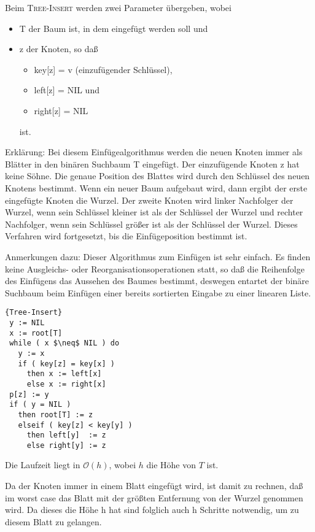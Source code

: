 \documentclass[ngerman,draft,parskip=half*,twoside]{scrreprt}
\theoremstyle{break}
\theoremstyle{nonumberbreak}
\newcommand*{\OO}{\mathcal{O}}      %
\begin{document}
  	\begin{description}
			\item{Beim \textsc{Tree-Insert} werden zwei Parameter übergeben, wobei}
			\begin{itemize}
				\item T der Baum ist, in dem eingefügt werden soll und
		 		\item z der Knoten, so daß	
		 		\begin{itemize}
					\item key[z]   = v (einzufügender Schlüssel),
					\item left[z]  = NIL und
					\item right[z] = NIL
				\end{itemize}
				ist.
			\end{itemize}
		\end{description}
 	Erklärung:
	Bei diesem Einfügealgorithmus werden die neuen Knoten immer als 
	Blätter in den binären Suchbaum T eingefügt. Der einzufügende 
	Knoten z hat keine Söhne. Die genaue Position des Blattes wird 
	durch den Schlüssel des neuen Knotens bestimmt. Wenn ein neuer 
	Baum aufgebaut wird, dann ergibt der erste eingefügte Knoten die 
	Wurzel. Der zweite Knoten wird linker Nachfolger der Wurzel, wenn 
	sein Schlüssel kleiner ist als der Schlüssel der Wurzel und rechter 
	Nachfolger, wenn sein Schlüssel größer ist als der Schlüssel der 
	Wurzel. Dieses Verfahren wird fortgesetzt, bis die Einfügeposition bestimmt ist.

	Anmerkungen dazu:
	Dieser Algorithmus zum Einfügen ist sehr einfach. Es finden keine 
	Ausgleichs- oder Reorganisationsoperationen statt, so daß die 
	Reihenfolge des Einfügens das Aussehen des Baumes bestimmt, deswegen 
	entartet der binäre Suchbaum beim Einfügen einer bereits sortierten Eingabe
	zu einer linearen Liste. 

\begin{Algorithmus}
\begin{lstlisting}[frame=tlrb, mathescape=true, title=\textsc{Tree-Insert}, gobble=1]{Tree-Insert}
 y := NIL
 x := root[T]
 while ( x $\neq$ NIL ) do
   y := x
   if ( key[z] = key[x] ) 
     then x := left[x]
     else x := right[x]
 p[z] := y
 if ( y = NIL )
   then root[T] := z
   elseif ( key[z] < key[y] )
     then left[y]  := z
     else right[y] := z    
	    \end{lstlisting}

Die Laufzeit liegt in $\OO(h)$, wobei $h$ die Höhe von $T$ ist.
\end{Algorithmus}    
    Da der Knoten immer in einem Blatt eingefügt wird, ist damit zu rechnen,
    daß im worst case das Blatt mit der größten Entfernung von der Wurzel
    genommen wird. Da dieses die Höhe h hat sind folglich auch h Schritte
    notwendig, um zu diesem Blatt zu gelangen.
        
\end{document}
